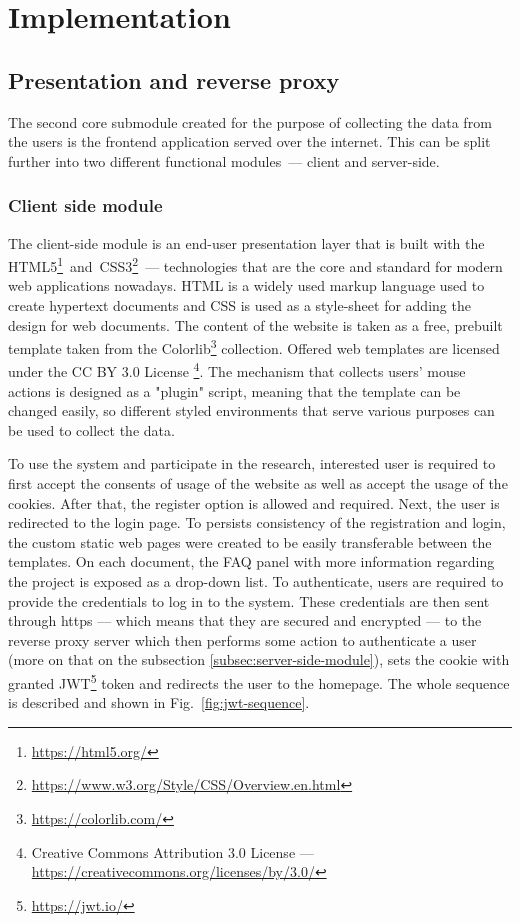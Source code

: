 \chapter{Implementation}\label{ch:implementation}

\section{Presentation and reverse proxy}\label{sec:reverse-proxy}
The second core submodule created for the purpose of collecting the data from the users is the frontend application served over the internet. This can be split further into two different functional modules~--- client and server-side.

\subsection{Client side module}\label{subsec:client-side-module}
The client-side module is an end-user presentation layer that is built with the HTML5\footnote{\url{https://html5.org/}}~and~CSS3\footnote{\url{https://www.w3.org/Style/CSS/Overview.en.html}}~--- technologies that are the core and standard for modern web applications nowadays.
HTML is a widely used markup language used to create hypertext documents and CSS is used as a style-sheet for adding the design for web documents.
The content of the website is taken as a free, prebuilt template taken from the Colorlib\footnote{\url{https://colorlib.com/}} collection.
Offered web templates are licensed under the CC BY 3.0 License \footnote{Creative Commons Attribution 3.0 License --- \url{https://creativecommons.org/licenses/by/3.0/}}.
The mechanism that collects users' mouse actions is designed as a "plugin" script, meaning that the template can be changed easily, so different styled environments that serve various purposes can be used to collect the data.

To use the system and participate in the research, interested user is required to first accept the consents of usage of the website as well as accept the usage of the cookies.
After that, the register option is allowed and required.
Next, the user is redirected to the login page.
To persists consistency of the registration and login, the custom static web pages were created to be easily transferable between the templates.
On each document, the FAQ panel with more information regarding the project is exposed as a drop-down list.
To authenticate, users are required to provide the credentials to log in to the system.
These credentials are then sent through https --- which means that they are secured and encrypted --- to the reverse proxy server which then performs some action to authenticate a user (more on that on the subsection \ref{subsec:server-side-module}), sets the cookie with granted JWT\footnote{\url{https://jwt.io/}} token and redirects the user to the homepage.
The whole sequence is described and shown in \mbox{Fig.~\ref{fig:jwt-sequence}}.

